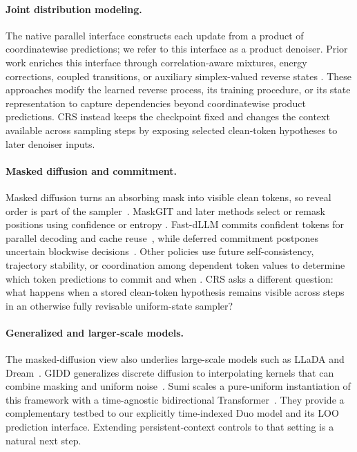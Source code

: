 \documentclass{article}
\newcommand{\1}{\mathbf 1}
\newcommand{\CRS}{\textsc{CRS}}
\theoremstyle{definition}
\begin{document}
\paragraph{Joint distribution modeling.}
The native parallel interface constructs each update from a product of coordinatewise predictions; we refer to this interface as a product denoiser. Prior work enriches this interface through correlation-aware mixtures, energy corrections, coupled transitions, or auxiliary simplex-valued reverse states
\citep{hayakawa2025distillation,xu2024edlm,li2026codd,sakurai2026simplax}.
These approaches modify the learned reverse process, its training procedure, or its state representation to capture dependencies beyond coordinatewise product predictions. \CRS{} instead keeps the checkpoint fixed and changes the context available across sampling steps by exposing selected clean-token hypotheses to later denoiser inputs.

\paragraph{Masked diffusion and commitment.}
Masked diffusion turns an absorbing mask into visible clean tokens, so reveal
order is part of the sampler~\citep{sahoo2024simple,shi2024simplified}.
MaskGIT and later methods select or remask positions using confidence or entropy
\citep{chang2022maskgit,hayakawa2026demystifying,benhamu2025entropy,
wang2025remasking}. Fast-dLLM commits confident tokens for parallel decoding
and cache reuse~\citep{wu2025fastdllm}, while deferred commitment postpones
uncertain blockwise decisions~\citep{shu2026deferred}. Other policies use future self-consistency, trajectory stability, or coordination among dependent token values to determine which token predictions to commit and when
\citep{wang2026selfcontained,sun2026pathmatters,wang2026tacg,yao2026cocommit}.
\CRS{} asks a different question: what happens when a stored clean-token hypothesis remains visible across steps in an otherwise fully revisable uniform-state sampler?

\paragraph{Generalized and larger-scale models.}
The masked-diffusion view also underlies large-scale models such as LLaDA and
Dream~\citep{nie2025llada,ye2025dream}.
GIDD generalizes discrete diffusion to interpolating kernels that can combine
masking and uniform noise~\citep{vonrutte2025gidd}. Sumi scales a pure-uniform
instantiation of this framework with a time-agnostic bidirectional
Transformer~\citep{ye2026sumi}. They provide a complementary testbed to our
explicitly time-indexed Duo model and its LOO prediction
interface. Extending persistent-context controls to that setting is a natural
next step.
\end{document}
